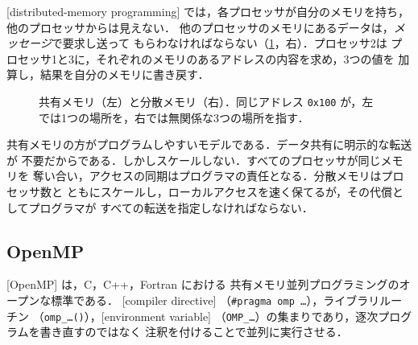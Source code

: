 \documentclass[../main.tex]{subfiles}
\begin{document}
\begin{definition}[分散メモリプログラミング]
  [distributed-memory programming]
  では，各プロセッサが自分のメモリを持ち，他のプロセッサからは見えない．
  他のプロセッサのメモリにあるデータは，\emph{メッセージ}で要求し送って
  もらわなければならない（\cref{fig:l02-memory-models}，右）．プロセッサ2は
  プロセッサ1と3に，それぞれのメモリのあるアドレスの内容を求め，3つの値を
  加算し，結果を自分のメモリに書き戻す．
\end{definition}

\begin{figure}[tb]
  \centering
  
  \caption{共有メモリ（左）と分散メモリ（右）．同じアドレス \texttt{0x100}
    が，左では1つの場所を，右では無関係な3つの場所を指す．}
  \label{fig:l02-memory-models}
\end{figure}


共有メモリの方がプログラムしやすいモデルである．データ共有に明示的な転送が
不要だからである．しかしスケールしない．すべてのプロセッサが同じメモリを
奪い合い，アクセスの同期はプログラマの責任となる．分散メモリはプロセッサ数と
ともにスケールし，ローカルアクセスを速く保てるが，その代償としてプログラマが
すべての転送を指定しなければならない．

\subsection{OpenMP}

\begin{definition}[OpenMP]
  [OpenMP] は，C，C++，Fortran における
  共有メモリ並列プログラミングのオープンな標準である．
  [compiler directive]
  （\texttt{\#pragma omp \ldots}），ライブラリルーチン
  （\texttt{omp\_\ldots()}），[environment variable]
  （\texttt{OMP\_\ldots}）の集まりであり，逐次プログラムを書き直すのではなく
  注釈を付けることで並列に実行させる．
\end{definition}
\end{document}
